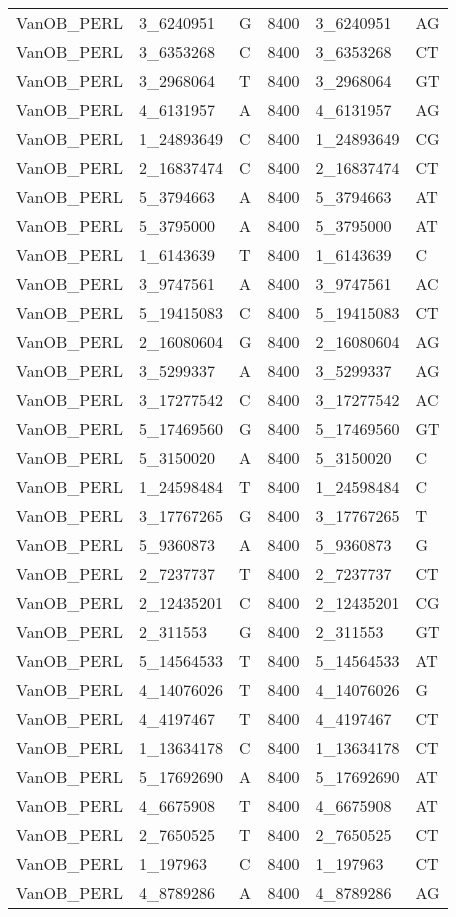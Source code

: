 \begin{center}
\begin{longtable}{|l|l|l|l|l|l|}
VanOB\_PERL&3\_6240951&G&8400&3\_6240951&AG\\
VanOB\_PERL&3\_6353268&C&8400&3\_6353268&CT\\
VanOB\_PERL&3\_2968064&T&8400&3\_2968064&GT\\
VanOB\_PERL&4\_6131957&A&8400&4\_6131957&AG\\
VanOB\_PERL&1\_24893649&C&8400&1\_24893649&CG\\
VanOB\_PERL&2\_16837474&C&8400&2\_16837474&CT\\
VanOB\_PERL&5\_3794663&A&8400&5\_3794663&AT\\
VanOB\_PERL&5\_3795000&A&8400&5\_3795000&AT\\
VanOB\_PERL&1\_6143639&T&8400&1\_6143639&C\\
VanOB\_PERL&3\_9747561&A&8400&3\_9747561&AC\\
VanOB\_PERL&5\_19415083&C&8400&5\_19415083&CT\\
VanOB\_PERL&2\_16080604&G&8400&2\_16080604&AG\\
VanOB\_PERL&3\_5299337&A&8400&3\_5299337&AG\\
VanOB\_PERL&3\_17277542&C&8400&3\_17277542&AC\\
VanOB\_PERL&5\_17469560&G&8400&5\_17469560&GT\\
VanOB\_PERL&5\_3150020&A&8400&5\_3150020&C\\
VanOB\_PERL&1\_24598484&T&8400&1\_24598484&C\\
VanOB\_PERL&3\_17767265&G&8400&3\_17767265&T\\
VanOB\_PERL&5\_9360873&A&8400&5\_9360873&G\\
VanOB\_PERL&2\_7237737&T&8400&2\_7237737&CT\\
VanOB\_PERL&2\_12435201&C&8400&2\_12435201&CG\\
VanOB\_PERL&2\_311553&G&8400&2\_311553&GT\\
VanOB\_PERL&5\_14564533&T&8400&5\_14564533&AT\\
VanOB\_PERL&4\_14076026&T&8400&4\_14076026&G\\
VanOB\_PERL&4\_4197467&T&8400&4\_4197467&CT\\
VanOB\_PERL&1\_13634178&C&8400&1\_13634178&CT\\
VanOB\_PERL&5\_17692690&A&8400&5\_17692690&AT\\
VanOB\_PERL&4\_6675908&T&8400&4\_6675908&AT\\
VanOB\_PERL&2\_7650525&T&8400&2\_7650525&CT\\
VanOB\_PERL&1\_197963&C&8400&1\_197963&CT\\
VanOB\_PERL&4\_8789286&A&8400&4\_8789286&AG\\

\end{longtable}
\end{center}
